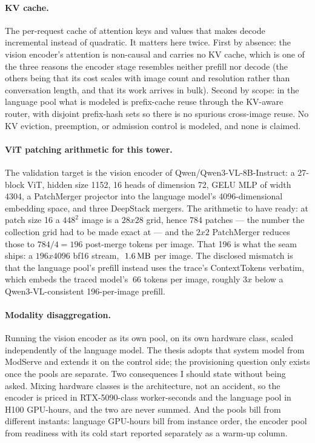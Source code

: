 \documentclass[11pt,a4paper]{article}
\def\times{x}\def\rho{rho}\def\approx{~}\def\leq{<=}\def\geq{>=}%
\def\emph#1{#1}\def\texttt#1{#1}%
\begin{document}
\paragraph{KV cache.} The per-request cache of attention keys and values that
makes decode incremental instead of quadratic. It matters here twice. First
by absence: the vision encoder's attention is non-causal and carries no KV
cache, which is one of the three reasons the encoder stage resembles neither
prefill nor decode (the others being that its cost scales with image count
and resolution rather than conversation length, and that its work arrives in
bulk). Second by scope: in the language pool what is modeled is prefix-cache
reuse through the KV-aware router, with disjoint prefix-hash sets so there is
no spurious cross-image reuse. No KV eviction, preemption, or admission
control is modeled, and none is claimed.

\paragraph{ViT patching arithmetic for this tower.} The validation target is
the vision encoder of \texttt{Qwen/Qwen3-VL-8B-Instruct}: a 27-block ViT,
hidden size 1152, 16 heads of dimension 72, GELU MLP of width 4304, a
PatchMerger projector into the language model's 4096-dimensional embedding
space, and three DeepStack mergers. The arithmetic to have ready: at patch
size 16 a $448^2$ image is a $28\times28$ grid, hence \emph{784 patches} ---
the number the collection grid had to be made exact at --- and the
$2\times2$ PatchMerger reduces those to $784/4 = 196$ post-merge
tokens per image. That 196 is what the seam ships: a $196 \times 4096$ bf16
stream, ${\approx}\SI{1.6}{\mega\byte}$ per image. The disclosed mismatch is
that the language pool's prefill instead uses the trace's
\texttt{ContextTokens} verbatim, which embeds the \emph{traced} model's
${\approx}66$ tokens per image, roughly $3\times$ below a Qwen3-VL-consistent
196-per-image prefill.

\paragraph{Modality disaggregation.} Running the vision encoder as its own
pool, on its own hardware class, scaled independently of the language model.
The thesis adopts that system model from ModServe and extends it on the
\emph{control} side; the provisioning question only exists once the pools are
separate. Two consequences I should state without being asked. Mixing
hardware classes is the architecture, not an accident, so the encoder is
priced in RTX-5090-class worker-seconds and the language pool in H100
GPU-hours, and the two are never summed. And the pools bill from different
instants: language GPU-hours bill from instance \emph{order}, the encoder
pool from \emph{readiness} with its cold start reported separately as a
warm-up column.
\end{document}
